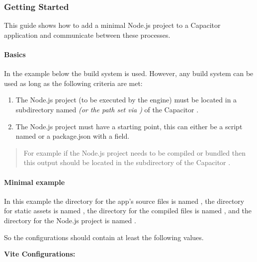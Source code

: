 
\subsubsection{Getting Started}
\label{sec:Capacitor-NodeJS:GettingStarted}

This guide shows how to add a minimal Node.js project to a Capacitor application and communicate between these processes.

\paragraph{Basics}
\label{sec:Capacitor-NodeJS:Basics}

In the example below the  build system is used. However, any build system can be used as long as the following criteria are met:

\begin{enumerate}
  \item The Node.js project (to be executed by the engine) must be located in a subdirectory named  \textit{(or the path set via )} of the Capacitor .
  \item The Node.js project must have a starting point, this can either be a script named  or a package.json with a  field.
\end{enumerate}

\begin{quote}
  For example if the Node.js project needs to be compiled or bundled then this output should be located in the subdirectory of the Capacitor .
\end{quote}

\newpage

\paragraph{Minimal example}
\label{sec:Capacitor-NodeJS:MinimalExample}

In this example the directory for the app's source files is named , the directory for static assets is named ,
the directory for the compiled files is named , and the directory for the Node.js project is named .

So the configurations should contain at least the following values. \cite{vite, capacitor:docs}

\textbf{Vite Configurations:}

